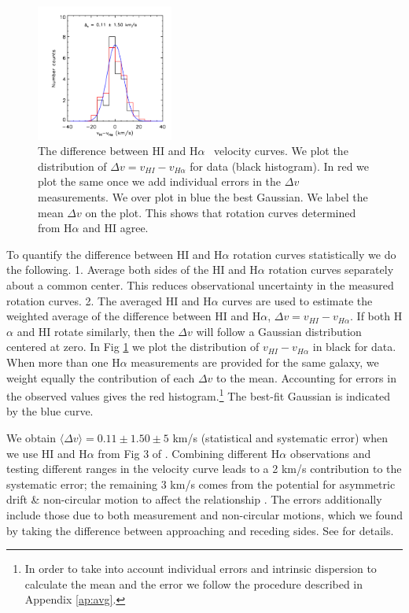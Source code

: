 \documentclass[useAMS,usenatbib,twocolumn]{mn2e}
\newcommand{\ha}{H$\alpha$}
\begin{document}
\begin{figure}
\begin{center}
\includegraphics[trim= 0cm 0cm 0cm 0cm, clip = true,
width=0.4\textwidth]{figures/vivalpha.png}
\caption{The difference between HI and \ha~ velocity curves.
We plot the distribution of $\Delta {v}=v_{HI}-v_{H\alpha}$ for
\citet{Swaters2009} data (black histogram). In red we plot the same
once we add individual errors in the $\Delta v$ measurements. We over plot in
blue the best Gaussian. We label the mean $\Delta v$ on the plot. This
shows that rotation curves determined from \ha{} and HI agree.}
\label{h1-ha-rot}
\end{center}
\end{figure}


To quantify the difference between HI and \ha{} rotation curves statistically
we do the following. 1. Average both sides of the HI and \ha{} rotation curves
separately about a common center. This reduces observational uncertainty in the
measured rotation curves. 2. The averaged HI and \ha{} curves are used to
estimate the weighted average of the difference between HI and \ha{}, $\Delta
v = v_{HI} - v_{H\alpha}$.
If both \ha{} and HI rotate similarly, then the $\Delta v$ will
follow a  Gaussian distribution centered at zero.
In Fig \ref{h1-ha-rot} we plot the distribution of $v_{HI}-v_{H\alpha}$ in
black for \citet{Swaters2009} data. When more than one
H$\alpha$ measurements are provided for the same galaxy, we weight equally the
contribution of each  $\Delta v$ to the mean. Accounting for errors in the
observed values gives the red histogram.\footnote{
In order to take into account individual errors and
intrinsic dispersion to calculate the mean and the error we follow the
procedure described in Appendix \ref{ap:avg}.}  The best-fit Gaussian is
indicated by the blue curve.

We obtain $\langle \Delta v\rangle=0.11\pm 1.50 \pm 5$ km/s (statistical and
systematic error) when we use HI and \ha{}
from Fig 3 of \citet{Swaters2009}.  Combining different \ha{} observations
and testing different ranges in the velocity curve leads to a 2 km/s
contribution to the systematic error; the remaining 3 km/s comes from the
potential for asymmetric drift \& non-circular motion to affect the
relationship \citep{Swaters2009, deblok2002}. The errors
additionally include those due to both measurement and non-circular motions,
which we found by taking the difference between approaching and receding
sides. See \citet{Swaters2009} for details. 
\end{document}
